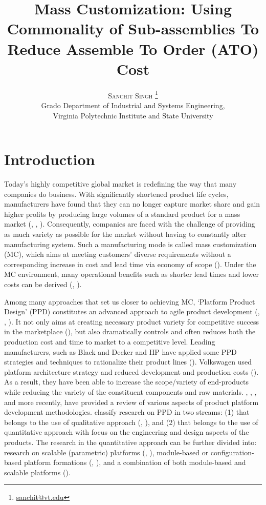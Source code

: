 \documentclass[twoside,onecolumn,12pt,letterpaper]{article}
\title{\bfseries Mass Customization: Using Commonality of Sub-assemblies To Reduce Assemble To Order (ATO) Cost} %
\author{
\textsc{Sanchit Singh \thanks{\href{mailto:sanchit@vt.edu}{sanchit@vt.edu}}}\\
\normalsize Grado Department of Industrial and Systems Engineering, \\
\normalsize Virginia Polytechnic Institute and State University \\
}
\date{} %
\begin{document}
\maketitle
\section{Introduction\label{sec:introduction}}

Today’s highly competitive global market is redefining the way that many companies do business. With significantly shortened product life cycles, manufacturers have found that they can no longer capture market share and gain higher profits by producing large volumes of a standard product for a mass market (\citet{qiao2002general}, \citet{kumar2007scalable}, \citet{qu2011two}). Consequently, companies are faced with the challenge of providing as much variety as possible for the market without having to constantly alter manufacturing system. Such a manufacturing mode is called mass customization (MC), which aims at meeting customers’ diverse requirements without a corresponding increase in cost and lead time via economy of scope (\citet{jiao1998design}). Under the MC environment, many operational benefits such as shorter lead times and lower costs can be derived (\citet{park2008toward}, \citet{zhang2008simultaneous}).

Among many approaches that set us closer to achieving MC, `Platform Product Design' (PPD) constitutes an advanced approach to agile product development (\citet{wheelwright1992revolutionizing}, \citet{meyer1997power}, \citet{robertson1998planning}). It not only aims at creating necessary product variety for competitive success in the marketplace (\citet{salvador2002mass}), but also dramatically controls and often reduces both the production cost and time to market to a competitive level. Leading manufacturers, such as Black and Decker and HP have applied some PPD strategies and techniques to rationalize their product lines (\citet{meyer1997power}). Volkswagen used platform architecture strategy and reduced development and production costs (\citet{wilhelm1997platform}). As a result, they have been able to increase the scope/variety of end-products while reducing the variety of the constituent components and raw materials. \citet{krishnan2001product}, \citet{simpson2004product}, \citet{jose2005modular}, and more recently, \citet{allada2006product} have provided a review of various aspects of product platform development methodologies. \citet{allada2006product} classify research on PPD in two streams: (1) that belongs to the use of qualitative approach (\citet{martin1997design}, \citet{kota2000metric}), and (2) that belongs to the use of quantitative approach with focus on the engineering and design aspects of the products. The research in the quantitative approach can be further divided into: research on scalable (parametric) platforms (\citet{simpson2001balancing}, \citet{hernandez2003platform}), module-based or configuration-based platform formations (\citet{fujita1999product}, \citet{ben2009solving}), and a combination of both module-based and scalable platforms (\citet{fujita2004pro}).
\end{document}
